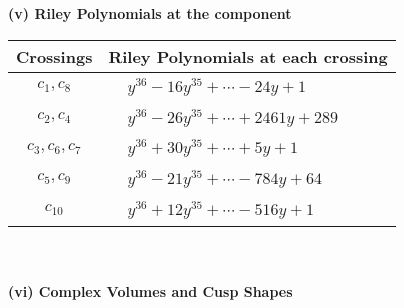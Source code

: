 \documentclass[1p]{elsarticle_modified}
\theoremstyle{definition}
\begin{document}
\flushleft \textbf{(v) Riley Polynomials at the component}\newline \\
\begin{tabular}{m{50pt}|m{274pt}}
Crossings & \hspace{64pt}Riley Polynomials at each crossing \\
\hline $$\begin{aligned}c_{1},c_{8}\end{aligned}$$&$\begin{aligned}
&y^{36}-16 y^{35}+\cdots-24 y+1
\end{aligned}$\\
\hline $$\begin{aligned}c_{2},c_{4}\end{aligned}$$&$\begin{aligned}
&y^{36}-26 y^{35}+\cdots+2461 y+289
\end{aligned}$\\
\hline $$\begin{aligned}c_{3},c_{6},c_{7}\end{aligned}$$&$\begin{aligned}
&y^{36}+30 y^{35}+\cdots+5 y+1
\end{aligned}$\\
\hline $$\begin{aligned}c_{5},c_{9}\end{aligned}$$&$\begin{aligned}
&y^{36}-21 y^{35}+\cdots-784 y+64
\end{aligned}$\\
\hline $$\begin{aligned}c_{10}\end{aligned}$$&$\begin{aligned}
&y^{36}+12 y^{35}+\cdots-516 y+1
\end{aligned}$\\
\hline
\end{tabular}\\~\\
\newpage\flushleft \textbf{(vi) Complex Volumes and Cusp Shapes}
\end{document}
